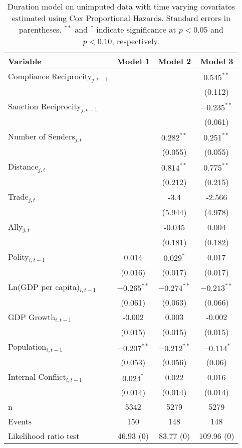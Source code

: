 \begin{table}[ht]
\centering
{\normalsize
\begin{tabular}{lccc}
 Variable & Model 1 & Model 2 & Model 3 \\ 
  \hline
\hline
Compliance Reciprocity$_{j,t-1}$ &  &  & $0.545^{\ast\ast}$ \\ 
   &  &  & (0.112) \\ 
  Sanction Reciprocity$_{j,t-1}$ &  &  & $-0.235^{\ast\ast}$ \\ 
   &  &  & (0.061) \\ 
   \hline
Number of Senders$_{j,t}$ &  & $0.282^{\ast\ast}$ & $0.251^{\ast\ast}$ \\ 
   &  & (0.055) & (0.055) \\ 
  Distance$_{j,t}$ &  & $0.814^{\ast\ast}$ & $0.775^{\ast\ast}$ \\ 
   &  & (0.212) & (0.215) \\ 
  Trade$_{j,t}$ &  & -3.4 & -2.566 \\ 
   &  & (5.944) & (4.978) \\ 
  Ally$_{j,t}$ &  & -0.045 & 0.004 \\ 
   &  & (0.181) & (0.182) \\ 
   \hline
Polity$_{i,t-1}$ & 0.014 & $0.029^{\ast}$ & 0.017 \\ 
   & (0.016) & (0.017) & (0.017) \\ 
  Ln(GDP per capita)$_{i,t-1}$ & $-0.265^{\ast\ast}$ & $-0.274^{\ast\ast}$ & $-0.213^{\ast\ast}$ \\ 
   & (0.061) & (0.063) & (0.066) \\ 
  GDP Growth$_{i,t-1}$ & -0.002 & 0.003 & -0.002 \\ 
   & (0.015) & (0.015) & (0.015) \\ 
  Population$_{i,t-1}$ & $-0.207^{\ast\ast}$ & $-0.212^{\ast\ast}$ & $-0.114^{\ast}$ \\ 
   & (0.053) & (0.056) & (0.06) \\ 
  Internal Conflict$_{i,t-1}$ & $0.024^{\ast}$ & 0.022 & 0.016 \\ 
   & (0.014) & (0.014) & (0.014) \\ 
   \hline
n & 5342 & 5279 & 5279 \\ 
  Events & 150 & 148 & 148 \\ 
  Likelihood ratio test & 46.93 (0) & 83.77 (0) & 109.96 (0) \\ 
   \hline
\hline
\end{tabular}
}
\caption{Duration model on unimputed data with time varying covariates estimated using Cox Proportional Hazards. Standard errors in parentheses. $^{**}$ and $^{*}$ indicate significance at $p< 0.05 $ and $p< 0.10 $, respectively.} 
\label{tab:regResultsNoImp}
\end{table}
